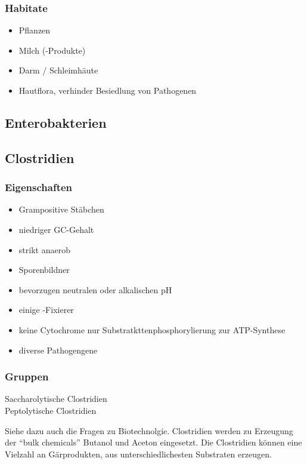 \subsubsection*{Habitate}
\begin{itemize}
	\item Pflanzen
	\item Milch (-Produkte)
	\item Darm / Schleimhäute
	\item Hautflora, verhinder Besiedlung von Pathogenen
\end{itemize}

\subsection{Enterobakterien}

\subsection{Clostridien}

\subsubsection*{Eigenschaften}
\begin{itemize}
	\item Grampositive Stäbchen
	 \item niedriger GC-Gehalt
	 \item strikt anaerob
	 \item Sporenbildner
	 \item bevorzugen neutralen oder alkalischen pH
	 \item einige -Fixierer
	 \item keine Cytochrome \textrightarrown nur Substratkttenphosphorylierung zur ATP-Synthese
	 \item diverse Pathogengene
\end{itemize}

\subsubsection*{Gruppen}
\begin{description}
	\item[Saccharolytische Clostridien]
	\item[Peptolytische Clostridien]
\end{description}

Siehe dazu auch die Fragen zu Biotechnolgie.
Clostridien werden zu Erzeugung der ``bulk chemicals'' Butanol
und Aceton eingesetzt.
Die Clostridien können eine Vielzahl an Gärprodukten,
aus unterschiedlichesten Substraten erzeugen.

